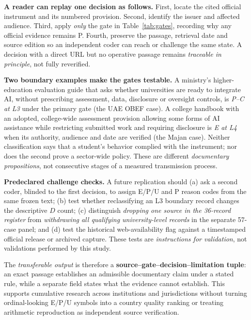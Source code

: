 \documentclass[conference,letterpaper]{IEEEtran}
\begin{document}
\textbf{A reader can replay one decision as follows.} First, locate the cited official instrument and its numbered provision. Second, identify the issuer and affected audience. Third, apply \emph{only} the gate in Table~\ref{tab:gates}, recording why any official evidence remains P. Fourth, preserve the passage, retrieval date and source edition so an independent coder can reach or challenge the same state. A decision with a direct URL but no operative passage remains \emph{traceable in principle}, not fully reverified.

\textbf{Two boundary examples make the gates testable.} A ministry's higher-education evaluation guide that asks whether universities are ready to integrate AI, without prescribing assessment, data, disclosure or oversight controls, is \emph{P--C at L3} under the primary gate (the UAE OBEF case). A college handbook with an adopted, college-wide assessment provision allowing some forms of AI assistance while restricting submitted work and requiring disclosure is \emph{E at L4} when its authority, audience and date are verified (the Majan case). Neither classification says that a student's behavior complied with the instrument; nor does the second prove a sector-wide policy. These are different \emph{documentary propositions}, not consecutive stages of a measured transmission process.

\textbf{Predeclared challenge checks.} A future replication should (a) ask a second coder, blinded to the first decision, to assign E/P/U and P reason codes from the same frozen text; (b) test whether reclassifying an L3 boundary record changes the descriptive $D$ count; (c) distinguish \emph{dropping one source in the 36-record register} from \emph{withdrawing all qualifying university-level records} in the separate 57-case panel; and (d) test the historical web-availability flag against a timestamped official release or archived capture. These tests are \emph{instructions for validation}, not validations performed by this study.

The \emph{transferable output} is therefore a \textbf{source--gate--decision--limitation tuple}: an exact passage establishes an admissible documentary claim under a stated rule, while a separate field states what the evidence cannot establish. This supports cumulative research across institutions and jurisdictions without turning ordinal-looking E/P/U symbols into a country quality ranking or treating arithmetic reproduction as independent source verification.
\end{document}
